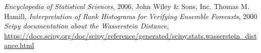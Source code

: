 \begin{thebibliography}{1}
	 \emph{Encyclopedia of Statistical Sciences}, 2006, John Wiley \& Sons, Inc.
	 Thomas M. Hamill, \emph{Interpretation of Rank Histograms for Verifying Ensemble Forecasts}, 2000
	 \emph{Scipy documentation about the Wasserstein Distance}, \url{https://docs.scipy.org/doc/scipy/reference/generated/scipy.stats.wasserstein_distance.html}
\end{thebibliography} 
